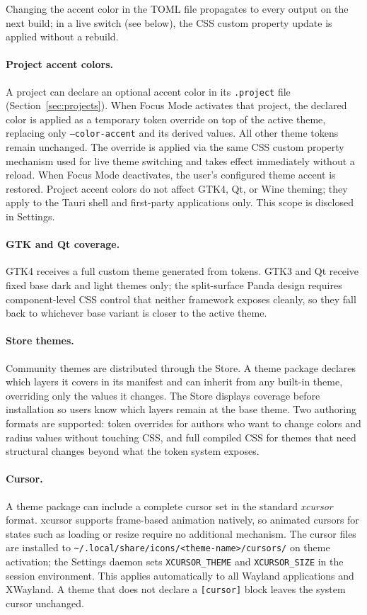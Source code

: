 Changing the accent color in the TOML file propagates to every output on the
next build; in a live switch (see below), the CSS custom property update is
applied without a rebuild.

\paragraph{Project accent colors.}
A project can declare an optional accent color in its \texttt{.project} file
(Section~\ref{sec:projects}). When Focus Mode activates that project, the
declared color is applied as a temporary token override on top of the active
theme, replacing only \texttt{--color-accent} and its derived values. All
other theme tokens remain unchanged. The override is applied via the same CSS
custom property mechanism used for live theme switching and takes effect
immediately without a reload. When Focus Mode deactivates, the user's
configured theme accent is restored. Project accent colors do not affect GTK4,
Qt, or Wine theming; they apply to the Tauri shell and first-party applications
only. This scope is disclosed in Settings.

\paragraph{GTK and Qt coverage.}
GTK4 receives a full custom theme generated from tokens. GTK3 and Qt receive
fixed base dark and light themes only; the split-surface Panda design requires
component-level CSS control that neither framework exposes cleanly, so they
fall back to whichever base variant is closer to the active theme.

\paragraph{Store themes.}
Community themes are distributed through the Store. A theme package declares
which layers it covers in its manifest and can inherit from any built-in theme,
overriding only the values it changes. The Store displays coverage before
installation so users know which layers remain at the base theme. Two authoring
formats are supported: token overrides for authors who want to change colors and
radius values without touching CSS, and full compiled CSS for themes that need
structural changes beyond what the token system exposes.

\paragraph{Cursor.}
A theme package can include a complete cursor set in the standard
\emph{xcursor} format. xcursor supports frame-based animation natively, so
animated cursors for states such as loading or resize require no additional
mechanism. The cursor files are installed to
\texttt{\textasciitilde/.local/share/icons/<theme-name>/cursors/} on theme
activation; the Settings daemon sets \texttt{XCURSOR\_THEME} and
\texttt{XCURSOR\_SIZE} in the session environment. This applies automatically
to all Wayland applications and XWayland. A theme that does not declare a
\texttt{[cursor]} block leaves the system cursor unchanged.

